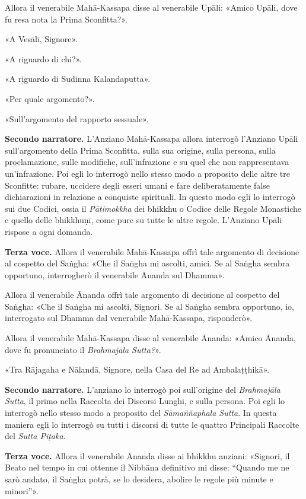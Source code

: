 Allora il venerabile Mahā-Kassapa disse al venerabile Upāli: «Amico
Upāli, dove fu resa nota la Prima Sconfitta?».


«A Vesālī, Signore».


«A riguardo di chi?».


«A riguardo di Sudinna Kalandaputta».


«Per quale argomento?».


«Sull’argomento del rapporto sessuale».


\textbf{Secondo narratore.} L’Anziano Mahā-Kassapa allora interrogò l’Anziano
Upāli sull’argomento della Prima Sconfitta, sulla sua origine, sulla
persona, sulla proclamazione, sulle modifiche, sull’infrazione e su quel
che non rappresentava un’infrazione. Poi egli lo interrogò nello stesso
modo a proposito delle altre tre Sconfitte: rubare, uccidere degli
esseri umani e fare deliberatamente false dichiarazioni in relazione a
conquiste spirituali. In questo modo egli lo interrogò sui due Codici,
ossia il \emph{Pātimokkha} dei bhikkhu o Codice delle Regole Monastiche e
quello delle bhikkhuṇī, come pure su tutte le altre regole. L’Anziano
Upāli rispose a ogni domanda.


\textbf{Terza voce.} Allora il venerabile Mahā-Kassapa offrì tale argomento di
decisione al cospetto del Saṅgha: «Che il Saṅgha mi ascolti, amici. Se
al Saṅgha sembra opportuno, interrogherò il venerabile Ānanda sul
Dhamma».


Allora il venerabile Ānanda offrì tale argomento di decisione al
cospetto del Saṅgha: «Che il Saṅgha mi ascolti, Signori. Se al Saṅgha
sembra opportuno, io, interrogato sul Dhamma dal venerabile
Mahā-Kassapa, risponderò».


Allora il venerabile Mahā-Kassapa disse al venerabile Ānanda: «Amico
Ānanda, dove fu pronunciato il \emph{Brahmajāla Sutta?}».


«Tra Rājagaha e Nālandā, Signore, nella Casa del Re ad Ambalaṭṭhikā».


\textbf{Secondo narratore.} L’anziano lo interrogò poi sull’origine del
\emph{Brahmajāla Sutta}, il primo nella Raccolta dei Discorsi Lunghi, e sulla
persona. Poi egli lo interrogò nello stesso modo a proposito del
\emph{Sāmaññaphala Sutta}. In questa maniera egli lo interrogò su tutti i
discorsi di tutte le quattro Principali Raccolte del \emph{Sutta Piṭaka.}


\textbf{Terza voce.} Allora il venerabile Ānanda disse ai bhikkhu anziani:
«Signori, il Beato nel tempo in cui ottenne il Nibbāna definitivo mi
disse: “Quando me ne sarò andato, il Saṅgha potrà, se lo desidera,
abolire le regole più minute e minori”».


